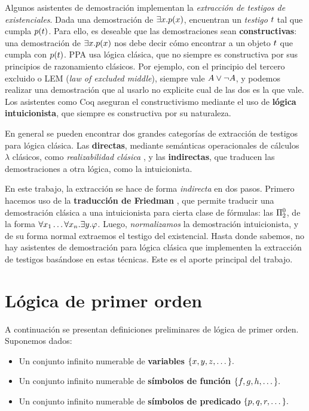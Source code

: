Algunos asistentes de demostración implementan la \textit{extracción de testigos
de existenciales}. Dada una demostración de $\exists x . p(x)$,
encuentran un \textit{testigo} $t$ tal que cumpla $p(t)$. Para ello,
es deseable que las demostraciones sean \textbf{constructivas}: una demostración
de $\exists x . p(x)$ nos debe decir cómo encontrar a un objeto
$t$ que cumpla con $p(t)$. PPA usa lógica clásica, que no siempre es constructiva por sus principios de razonamiento clásicos. Por ejemplo, con el principio del tercero excluido o LEM (\textit{law of excluded middle}), siempre
vale $A \vee \neg A$, y podemos realizar una demostración que al usarlo no explicite cual de las dos es la que vale. Los asistentes como Coq
aseguran el constructivismo mediante el uso de \textbf{lógica intuicionista},
que siempre es constructiva por su naturaleza.

En general se pueden encontrar dos grandes categorías de extracción de testigos para lógica clásica. Las \textbf{directas}, mediante semánticas operacionales de cálculos $\lambda$ clásicos, como \textit{realizabilidad clásica} \cite{miquel-friedman}, y las \textbf{indirectas}, que traducen las demostraciones a otra lógica, como la intuicionista.

En este trabajo, la extracción se hace de forma \textit{indirecta} en dos pasos.
Primero hacemos uso de la \textbf{traducción de Friedman}
\cite{selinger-friedman}, que permite traducir una demostración clásica a una
intuicionista para cierta clase de fórmulas: las $\Pi^0_{2}$, de la forma
$\forall x_1 \dots \forall x_n . \exists y . \varphi$. Luego,
\textit{normalizamos} la demostración intuicionista, y de su forma normal
extraemos el testigo del existencial. Hasta donde sabemos, no hay asistentes de demostración para lógica clásica que implementen la extracción de testigos basándose en estas técnicas. Este es el aporte principal del trabajo.

\section{Lógica de primer orden}

A continuación se presentan definiciones preliminares de lógica de primer orden. Suponemos dados:

\begin{itemize}
    \item Un conjunto infinito numerable de \textbf{variables}
    \(
        \{x, y, z, \dots\}.
    \)
    \item Un conjunto infinito numerable de \textbf{símbolos de función}
    \(
        \{f, g, h, \dots\}.
    \)
    \item Un conjunto infinito numerable de \textbf{símbolos de predicado}
    \(
        \{p, q, r, \dots\}.
    \)
\end{itemize}

